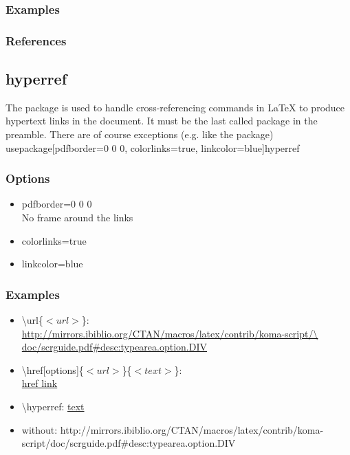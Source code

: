 \subsubsection{Examples}
\subsubsection{References}

\subsection{hyperref}
The package  is used to handle cross-referencing commands in
LaTeX to produce hypertext links in the document. It must be the last called
package in the preamble. There are of course exceptions (e.g. like the
 package)
\\usepackage[pdfborder={0 0 0}, colorlinks=true, linkcolor=blue]{hyperref}
\subsubsection{Options}
\begin{itemize}
    \item{pdfborder={0 0 0}\\
        No frame around the links}
    \item{colorlinks=true}
    \item{linkcolor=blue}
\end{itemize}
\subsubsection{Examples}
\begin{itemize}
    \item{\textbackslash url\{$<url>$\}:\\
        \url{http://mirrors.ibiblio.org/CTAN/macros/latex/contrib/koma-script/\
        doc/scrguide.pdf\#desc:typearea.option.DIV}}
    \item{\textbackslash href[options]\{$<url>$\}\{$<text>$\}:\\
        \href{http://mirrors.ibiblio.org/CTAN/macros/latex/contrib/koma-script/doc/scrguide.pdf\#desc:typearea.option.DIV}{href link}}
    \item{\textbackslash hyperref: \hyperref{http://mirrors.ibiblio.org/CTAN/macros/latex/contrib/koma-script/doc/scrguide.pdf\#desc:typearea.option.DIV}{category}{name}{text}}
    \item{without: http://mirrors.ibiblio.org/CTAN/macros/latex/contrib/koma-script/doc/scrguide.pdf\#desc:typearea.option.DIV}
\end{itemize}
